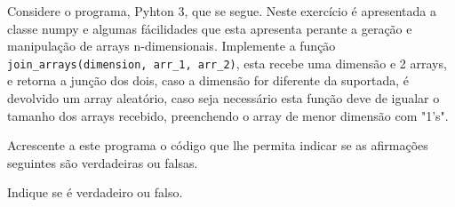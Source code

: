\documentclass[12pt,varwidth=16cm,border=1pt]{standalone}
\begin{document}
Considere o programa, Pyhton 3, que se segue. Neste exercício é apresentada a classe numpy e algumas fácilidades que esta apresenta perante a geração e manipulação de arrays n-dimensionais. Implemente a função \verb+join_arrays(dimension, arr_1, arr_2)+, esta recebe uma dimensão e 2 arrays, e retorna a junção dos dois, caso a dimensão for diferente da suportada, é devolvido um array aleatório, caso seja necessário esta função deve de igualar o tamanho dos arrays recebido, preenchendo o array de menor dimensão com "1's".



Acrescente a este programa o código que lhe permita indicar se as
afirmações seguintes são verdadeiras ou falsas.

Indique se é verdadeiro ou falso.
\end{document}
